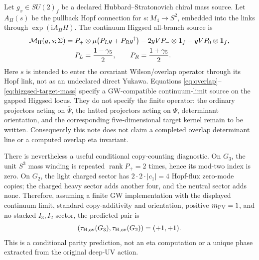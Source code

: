 \documentclass[11pt]{article}
\theoremstyle{definition}
\theoremstyle{remark}
\newcommand{\ii}{\mathrm i}
\begin{document}
Let \(g_x\in SU(2)_f\) be a declared Hubbard--Stratonovich chiral mass
source.  Let \(A_H(s)\) be the pullback Hopf connection for
\(s:M_4\to S^2\), embedded into the links through
\(\exp(\ii A_H H)\).  The continuum Higgsed all-branch source is
\begin{equation}
 \begin{split}
 \mathcal M_{\rm H}(g,s;\Sigma)
 ={}&P_+\otimes\mu\bigl(P_Lg+P_Rg^\dagger\bigr)
 -2yV P_-\otimes\bm1_f-yV P_0\otimes\bm1_f,\\
 &P_L=\frac{1-\gamma_5}{2},\qquad P_R=\frac{1+\gamma_5}{2}.
 \end{split}
 \label{eq:higgsed-target-mass}
\end{equation}
Here \(s\) is intended to enter the covariant Wilson/overlap operator through
its Hopf link, not as an undeclared direct Yukawa.  Equations
\eqref{eq:overlap}--\eqref{eq:higgsed-target-mass} specify a
GW-compatible continuum-limit source on the gapped Higgsed locus.  They do
not specify the finite operator: the ordinary projectors acting on
\(\bar\Psi\), the hatted projectors acting on \(\Psi\), determinant
orientation, and the corresponding five-dimensional target kernel remain to
be written.  Consequently this note does not claim a completed overlap
determinant line or a computed overlap eta invariant.

There is nevertheless a useful conditional copy-counting diagnostic.  On
\(G_3\), the unit \(S^3\) mass
winding is repeated \(\operatorname{rank}P_+=2\) times, hence its mod-two
index is zero.  On \(G_2\), the light charged sector has
\(2\cdot2\cdot|c_1|=4\) Hopf-flux zero-mode copies; the charged heavy sector
adds another four, and the neutral sector adds none.  Therefore, assuming a
finite GW implementation with the displayed continuum limit, standard
copy-additivity and orientation, positive \(m_{\rm PV}=1\), and no stacked
\(I_3,I_2\) sector, the predicted pair is
\begin{equation}
 \left(\tau_{\rm H,ov}(G_3),\tau_{\rm H,ov}(G_2)\right)=(+1,+1).
 \label{eq:higgsed-overlap-pair}
\end{equation}
This is a conditional parity prediction, not an eta computation or a unique
phase extracted from the original deep-UV action.
\end{document}
